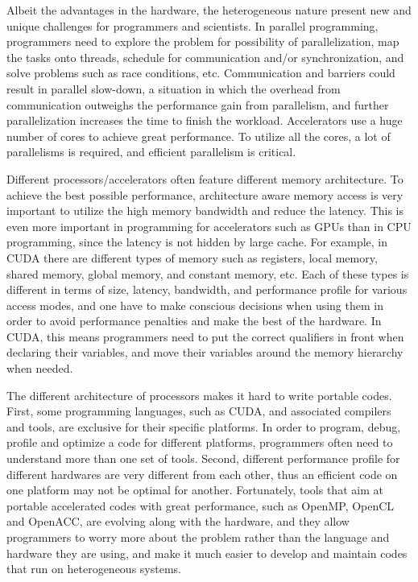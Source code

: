 Albeit the advantages in the hardware, the heterogeneous nature present new
and unique challenges for programmers and scientists. 
In parallel programming, programmers need to explore the problem for 
possibility of parallelization, map the tasks onto threads, schedule for
communication and/or synchronization, and solve problems such as race conditions,
etc. Communication and barriers could result in parallel slow-down, 
a situation in which the overhead from communication outweighs the performance 
gain from parallelism, and further parallelization increases the time to finish
the workload. 
Accelerators use a huge number of cores to achieve great performance. 
To utilize all the cores, a lot of parallelisms is required, and efficient 
parallelism is critical. 

Different processors/accelerators often feature different memory architecture.
To achieve the best possible performance, architecture aware memory access is 
very important to utilize the high memory bandwidth and reduce the latency.
This is even more important in programming for accelerators such as GPUs than in
CPU programming, since the latency is not hidden by large cache.
For example, in CUDA %
there are different types of memory such as registers, local memory, shared 
memory, global memory, and constant memory, etc. Each of these types is 
different in terms of size, latency, bandwidth, and performance profile for 
various access modes, and one have to make conscious decisions when using them
in order to avoid performance penalties and make the best of the hardware. 
In CUDA, this means programmers need to put the correct qualifiers in front when 
declaring their variables, and move their variables around the memory hierarchy 
when needed.
 

The different architecture of processors makes it hard to write portable codes.
First, some programming languages, such as CUDA, and associated compilers and tools,
 are exclusive for their specific platforms. In order to program, debug, profile 
and optimize a code for different platforms, programmers often need to understand 
more than one set of tools. 
Second, different performance profile for different hardwares are very
different from each other, thus an efficient code on one platform may not be
optimal for another. 
Fortunately, tools that aim at portable accelerated codes with great performance, such as 
OpenMP\cite{dagum1998openmp}, OpenCL\cite{Stone:2010:OPP:622179.1803953} and OpenACC\cite{OpenACC}, are evolving along with the hardware, and they allow programmers
to worry more about the problem rather than the language and hardware they are
using, and make it much easier to develop and maintain codes that run on heterogeneous systems.




